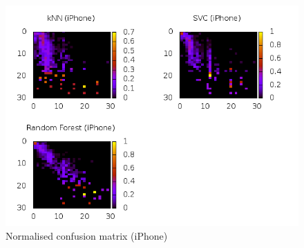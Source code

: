 \begin{figure}
\centering
\includegraphics[scale=0.55]{images/plots/machine_learning/iphone/conf_mat_iphone.png}
\caption{Normalised confusion matrix (iPhone)}
\label{conf_mat_iphone}
\end{figure}


